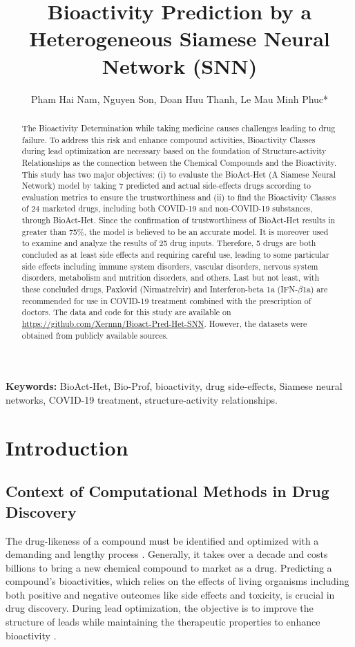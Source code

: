 \documentclass[conference]{IEEEtran}
\title{Bioactivity Prediction by a Heterogeneous Siamese Neural Network (SNN)}
\author{Pham Hai Nam, Nguyen Son, Doan Huu Thanh, Le Mau Minh Phuc*}
\affil{* University of Science and Technology of Hanoi}
\begin{document}
\maketitle
\begin{abstract}
  The Bioactivity Determination while taking medicine causes challenges leading to drug failure. To address this risk and enhance compound activities, Bioactivity Classes during lead optimization are necessary based on the foundation of Structure-activity Relationships as the connection between the Chemical Compounds and the Bioactivity. This study has two major objectives: (i) to evaluate the BioAct-Het (A Siamese Neural Network) model by taking 7 predicted and actual side-effects drugs according to evaluation metrics to ensure the trustworthiness and (ii) to find the Bioactivity Classes of 24 marketed drugs, including both COVID-19 and non-COVID-19 substances, through BioAct-Het. Since the confirmation of trustworthiness of BioAct-Het results in greater than 75\%, the model is believed to be an accurate model. It is moreover used to examine and analyze the results of 25 drug inputs. Therefore, 5 drugs are both concluded as at least side effects and requiring careful use, leading to some particular side effects including immune system disorders, vascular disorders, nervous system disorders, metabolism and nutrition disorders, and others. Last but not least, with these concluded drugs, Paxlovid (Nirmatrelvir) and Interferon-beta 1a (IFN-$\beta$1a) are recommended for use in COVID-19 treatment combined with the prescription of doctors. The data and code for this study are available on \url{https://github.com/Xernnn/Bioact-Pred-Het-SNN}. However, the datasets were obtained from publicly available sources.
\end{abstract}

\textbf{Keywords:} BioAct-Het, Bio-Prof, bioactivity, drug side-effects, Siamese neural networks, COVID-19 treatment, structure-activity relationships.

\section{Introduction}
\subsection{Context of Computational Methods in Drug Discovery}
The drug-likeness of a compound must be identified and optimized with a demanding and lengthy process \cite{Wouters}. Generally, it takes over a decade and costs billions to bring a new chemical compound to market as a drug. Predicting a compound's bioactivities, which relies on the effects of living organisms including both positive and negative outcomes like side effects and toxicity, is crucial in drug discovery. During lead optimization, the objective is to improve the structure of leads while maintaining the therapeutic properties to enhance bioactivity \citet{Hughes}.\\
\end{document}
